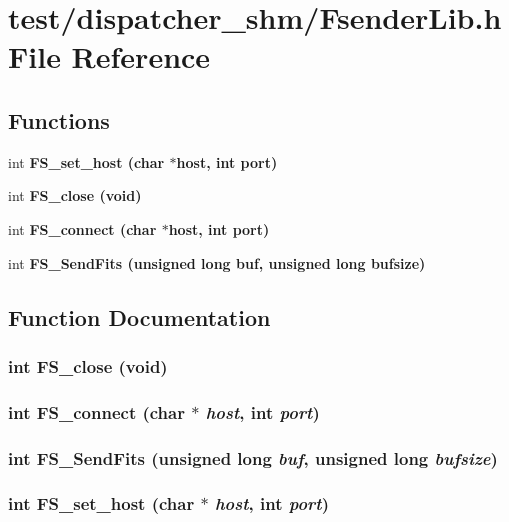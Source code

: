 \section{test/dispatcher\_\-shm/Fsender\-Lib.h File Reference}
\label{shm_2FsenderLib_8h}
\subsection*{Functions}
\begin{CompactItemize}
\item 
int \bf{FS\_\-set\_\-host} (char $\ast$host, int port)
\item 
int \bf{FS\_\-close} (void)
\item 
int \bf{FS\_\-connect} (char $\ast$host, int port)
\item 
int \bf{FS\_\-Send\-Fits} (unsigned long buf, unsigned long bufsize)
\end{CompactItemize}


\subsection{Function Documentation}
\subsubsection{\setlength{\rightskip}{0pt plus 5cm}int FS\_\-close (void)}\label{shm_2FsenderLib_8h_038eb319822692777b0feec260da2e39}


\subsubsection{\setlength{\rightskip}{0pt plus 5cm}int FS\_\-connect (char $\ast$ {\em host}, int {\em port})}\label{shm_2FsenderLib_8h_39d55c4b8b1d2056927d7be502c18282}


\subsubsection{\setlength{\rightskip}{0pt plus 5cm}int FS\_\-Send\-Fits (unsigned long {\em buf}, unsigned long {\em bufsize})}\label{shm_2FsenderLib_8h_dac28fa51c9fd2a4f21d0c44a6651584}


\subsubsection{\setlength{\rightskip}{0pt plus 5cm}int FS\_\-set\_\-host (char $\ast$ {\em host}, int {\em port})}\label{shm_2FsenderLib_8h_d7595a83319ff70a2c7b28694c706868}


